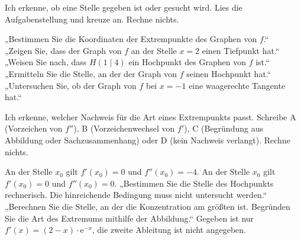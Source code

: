 \setcounter{aufgabe}{13}
\hypertarget{e2}{}

\begin{aufgabe}{Ich erkenne, ob eine Stelle gegeben ist oder gesucht wird. Lies die Aufgabenstellung und kreuze an. Rechne nichts.}
\begin{teile}
\teil „Bestimmen Sie die Koordinaten der Extrempunkte des Graphen von $f$.“ \\ 
\teil „Zeigen Sie, dass der Graph von $f$ an der Stelle $x = 2$ einen Tiefpunkt hat.“ \\ 
\teil „Weisen Sie nach, dass $H(1 \mid 4)$ ein Hochpunkt des Graphen von $f$ ist.“ \\ 
\teil „Ermitteln Sie die Stelle, an der der Graph von $f$ seinen Hochpunkt hat.“ \\ 
\teil „Untersuchen Sie, ob der Graph von $f$ bei $x = -1$ eine waagerechte Tangente hat.“ \\ 
\end{teile}
\end{aufgabe}

\begin{aufgabe}{Ich erkenne, welcher Nachweis für die Art eines Extrempunkts passt. Schreibe A (Vorzeichen von $f''$), B (Vorzeichenwechsel von $f'$), C (Begründung aus Abbildung oder Sachzusammenhang) oder D (kein Nachweis verlangt). Rechne nichts.}
\begin{teile}
\teil An der Stelle $x_0$ gilt $f'(x_0) = 0$ und $f''(x_0) = -4$. \leerfeld
\teil An der Stelle $x_0$ gilt $f'(x_0) = 0$ und $f''(x_0) = 0$. \leerfeld
\teil „Bestimmen Sie die Stelle des Hochpunkts rechnerisch. Die hinreichende Bedingung muss nicht untersucht werden.“ \leerfeld
\teil „Berechnen Sie die Stelle, an der die Konzentration am größten ist. Begründen Sie die Art des Extremums mithilfe der Abbildung.“ \leerfeld
\teil Gegeben ist nur $f'(x) = (2 - x)\cdot\mathrm{e}^{-x}$, die zweite Ableitung ist nicht angegeben. \leerfeld
\end{teile}
\end{aufgabe}

